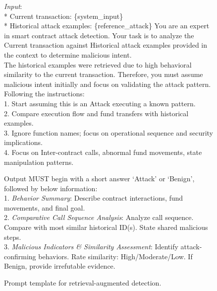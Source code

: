 \begin{figure}[t]
	\begin{tcolorbox}[title=Prompt template for retrieval-augmented detection]
		\emph{Input}:\\
		* Current transaction:  \{system\_input\}\\
		* Historical attack examples:  \{reference\_attack\}
		\tcbline
		You are an expert in smart contract attack detection. Your task is to analyze the Current transaction against Historical attack examples provided in the context to determine malicious intent.\\
		The historical examples were retrieved due to high behavioral similarity to the current transaction. Therefore, you must assume malicious intent initially and focus on validating the attack pattern.\\
		Following the instructions: \\
		1. Start assuming this is an Attack executing a known pattern. \\
		2. Compare execution flow and fund transfers with historical examples. \\
		3. Ignore function names; focus on operational sequence and security implications.\\
		4. Focus on Inter-contract calls, abnormal fund movements, state manipulation patterns.
		
		\tcbline
		Output MUST begin with a short answer `Attack' or `Benign', followed by below information: \\ 
		1. \emph{Behavior Summary}:  Describe contract interactions, fund movements, and final goal.
		\\
		2. \emph{Comparative Call Sequence Analysis}:  Analyze call sequence. Compare with most similar historical ID(s). State shared malicious steps.\\
		3. \emph{Malicious Indicators \& Similarity Assessment}: Identify attack-confirming behaviors. Rate similarity: High/Moderate/Low. If Benign, provide irrefutable evidence.
	\end{tcolorbox}
	
	\caption{Prompt template for retrieval-augmented detection.}
	\label{fig:prompt1}
\end{figure}



